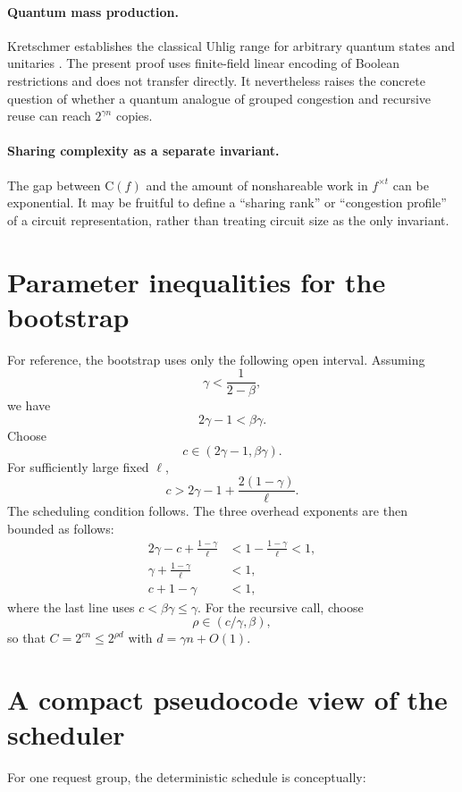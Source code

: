 \documentclass[11pt]{article}
\theoremstyle{definition}
\newcommand{\C}{\mathrm{C}}
\begin{document}
\paragraph{Quantum mass production.}
Kretschmer establishes the classical Uhlig range for arbitrary quantum states and unitaries \cite{Kretschmer2023}.  The present proof uses finite-field linear encoding of Boolean restrictions and does not transfer directly.  It nevertheless raises the concrete question of whether a quantum analogue of grouped congestion and recursive reuse can reach $2^{\gamma n}$ copies.

\paragraph{Sharing complexity as a separate invariant.}
The gap between $\C(f)$ and the amount of nonshareable work in $f^{\times t}$ can be exponential.  It may be fruitful to define a ``sharing rank'' or ``congestion profile'' of a circuit representation, rather than treating circuit size as the only invariant.

\appendix

\section{Parameter inequalities for the bootstrap}

For reference, the bootstrap uses only the following open interval.  Assuming
\[
 \gamma<\frac1{2-\beta},
\]
we have
\[
 2\gamma-1<\beta\gamma.
\]
Choose
\[
 c\in(2\gamma-1,\beta\gamma).
\]
For sufficiently large fixed $\ell$,
\[
 c>2\gamma-1+\frac{2(1-\gamma)}\ell.
\]
The scheduling condition follows.  The three overhead exponents are then bounded as follows:
\begin{align*}
 2\gamma-c+\frac{1-\gamma}{\ell}
 &<1-\frac{1-\gamma}{\ell}<1,\\
 \gamma+\frac{1-\gamma}{\ell}
 &<1,\\
 c+1-\gamma
 &<1,
\end{align*}
where the last line uses $c<\beta\gamma\le\gamma$.  For the recursive call, choose
\[
 \rho\in(c/\gamma,\beta),
\]
so that $C=2^{cn}\le2^{\rho d}$ with $d=\gamma n+O(1)$.

\section{A compact pseudocode view of the scheduler}

For one request group, the deterministic schedule is conceptually:
\end{document}
